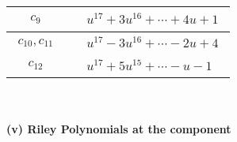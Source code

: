 \documentclass[1p]{elsarticle_modified}
\theoremstyle{definition}
\begin{document}
\begin{tabular}{m{50pt}|m{274pt}}
\hline $$\begin{aligned}c_{9}\end{aligned}$$&$\begin{aligned}
&u^{17}+3 u^{16}+\cdots+4 u+1
\end{aligned}$\\
\hline $$\begin{aligned}c_{10},c_{11}\end{aligned}$$&$\begin{aligned}
&u^{17}-3 u^{16}+\cdots-2 u+4
\end{aligned}$\\
\hline $$\begin{aligned}c_{12}\end{aligned}$$&$\begin{aligned}
&u^{17}+5 u^{15}+\cdots- u-1
\end{aligned}$\\
\hline
\end{tabular}\\~\\
\newpage\renewcommand{\arraystretch}{1}
\flushleft \textbf{(v) Riley Polynomials at the component}\newline \\
\end{document}
